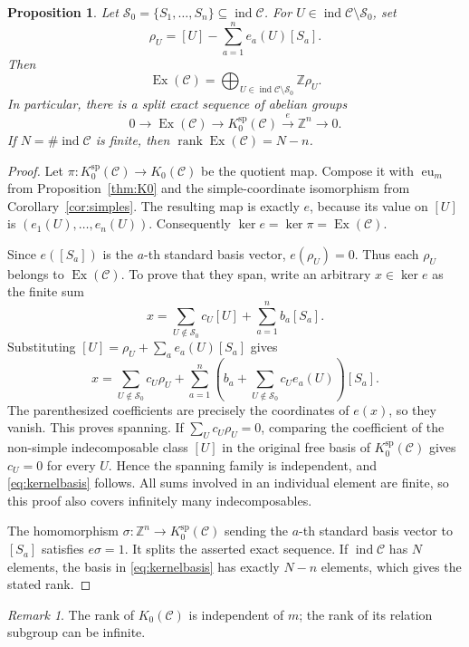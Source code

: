 \documentclass[pdflatex,sn-mathphys-num]{sn-jnl}
\numberwithin{equation}{section}
\newtheorem{proposition}[theorem]{Proposition}
\theoremstyle{definition}
\theoremstyle{remark}\newtheorem{remark}[theorem]{Remark}
\newcommand{\mathscrS}{\mathcal{S}_0}
\newcommand{\C}{\mathcal C}
\newcommand{\ind}{\operatorname{ind}}
\newcommand{\Ex}{\operatorname{Ex}}
\newcommand{\eu}{\operatorname{eu}}
\newcommand{\ksp}{K_0^{\mathrm{sp}}}
\begin{document}
\begin{proposition}\label{prop:kernel}
Let $\mathscrS=\{S_1,\ldots,S_n\}\subseteq\ind\C$. For
$U\in\ind\C\setminus\mathscrS$, set
\[
 \rho_U=[U]-\sum_{a=1}^n e_a(U)[S_a].
\]
Then
\begin{equation}\label{eq:kernelbasis}
 \Ex(\C)=\bigoplus_{U\in\ind\C\setminus\mathscrS}\mathbb Z\rho_U.
\end{equation}
In particular, there is a split exact sequence of abelian groups
\[
0\longrightarrow\Ex(\C)\longrightarrow\ksp(\C)
 \xrightarrow{\ e\ }\mathbb Z^n\longrightarrow0.
\]
If $N=\#\ind\C$ is finite, then $\operatorname{rank}\Ex(\C)=N-n$.
\end{proposition}
\begin{proof}
Let $\pi:\ksp(\C)\to K_0(\C)$ be the quotient map. Compose it
with $\eu_m$ from Proposition~\ref{thm:K0} and the simple-coordinate
isomorphism from Corollary~\ref{cor:simples}. The resulting map is
exactly $e$, because its value on $[U]$ is $(e_1(U),\ldots,e_n(U))$.
Consequently $\ker e=\ker\pi=\Ex(\C)$.

Since $e([S_a])$ is the $a$-th standard basis vector, $e(\rho_U)=0$.
Thus each $\rho_U$ belongs to $\Ex(\C)$. To prove that they span,
write an arbitrary $x\in\ker e$ as the finite sum
\[
 x=\sum_{U\notin\mathscrS}c_U[U]+\sum_{a=1}^n b_a[S_a].
\]
Substituting $[U]=\rho_U+\sum_a e_a(U)[S_a]$ gives
\[
 x=\sum_{U\notin\mathscrS}c_U\rho_U+
       \sum_{a=1}^n\left(b_a+\sum_{U\notin\mathscrS}c_Ue_a(U)\right)[S_a].
\]
The parenthesized coefficients are precisely the coordinates of
$e(x)$, so they vanish. This proves spanning. If
$\sum_U c_U\rho_U=0$, comparing the coefficient of the non-simple
indecomposable class $[U]$ in the original free basis of $\ksp(\C)$
gives $c_U=0$ for every $U$. Hence the spanning family is independent,
and \eqref{eq:kernelbasis} follows. All sums involved in an individual
element are finite, so this proof also covers infinitely many
indecomposables.

The homomorphism $\sigma:\mathbb Z^n\to\ksp(\C)$ sending the
$a$-th standard basis vector to $[S_a]$ satisfies $e\sigma=1$.
It splits the asserted exact sequence. If $\ind\C$ has $N$ elements,
the basis in \eqref{eq:kernelbasis} has exactly $N-n$ elements,
which gives the stated rank.
\end{proof}

\begin{remark}
The rank of $K_0(\C)$ is independent of $m$; the rank of its relation
subgroup can be infinite.
\end{remark}
\end{document}
